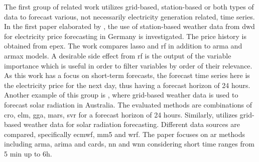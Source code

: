 The first group of related work utilizes grid-based, station-based or both types of data to forecast various, not necessarily electricity generation related, time series. In the first paper elaborated by , the use of station-based weather data from \gls{dwd} for electricity price forecasting in Germany is investigated. The price history is obtained from \gls{epex}. The work compares \gls{lasso} and \gls{rf} in addition to \gls{arma} and \gls{armax} models. A desirable side effect from \gls{rf} is the output of the variable importance which is useful in order to filter variables by order of their relevance. As this work has a focus on short-term forecasts, the forecast time series here is the electricity price for the next day, thus having a forecast horizon of 24 hours. Another example of this group is , where grid-based weather data is used to forecast solar radiation in Australia. The evaluated methods are combinations of \gls{cro}, \gls{elm}, \gls{gga}, \gls{mars}, \gls{svr} for a forecast horizon of 24 hours. Similarly,  utilizes grid-based weather data for solar radiation forecasting. Different data sources are compared, specifically \gls{ecmwf}, \gls{mm5} and \gls{wrf}. The paper focuses on \gls{ar} methods including \gls{arma}, \gls{arima} and \gls{cards}, \gls{nn} and \gls{wnn} considering short time ranges from 5 min up to 6h.\\

